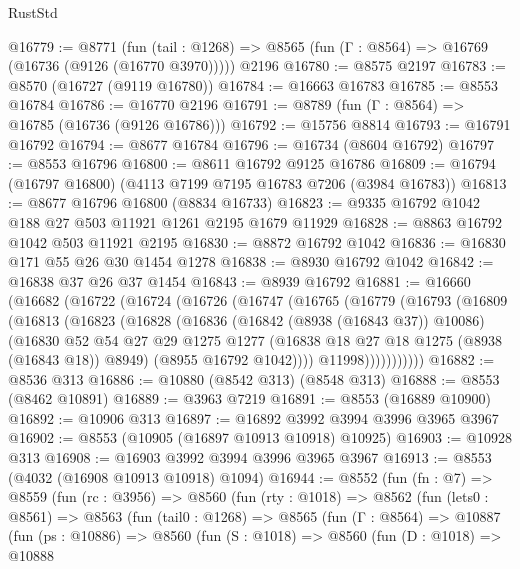 \begin{lexlean}{RustStd}
\begin{coremodule}
@16779 := @8771
    (fun (tail : @1268) => @8565 (fun (Γ : @8564) => @16769 (@16736 (@9126 (@16770 @3970)))))
    @2196
@16780 := @8575 @2197
@16783 := @8570 (@16727 (@9119 @16780))
@16784 := @16663 @16783
@16785 := @8553 @16784
@16786 := @16770 @2196
@16791 := @8789 (fun (Γ : @8564) => @16785 (@16736 (@9126 @16786)))
@16792 := @15756 @8814
@16793 := @16791 @16792
@16794 := @8677 @16784
@16796 := @16734 (@8604 @16792)
@16797 := @8553 @16796
@16800 := @8611 @16792 @9125 @16786
@16809 := @16794 (@16797 @16800) (@4113 @7199 @7195 @16783 @7206 (@3984 @16783))
@16813 := @8677 @16796 @16800 (@8834 @16733)
@16823 := @9335 @16792 @1042 @188 @27 @503 @11921 @1261 @2195 @1679 @11929
@16828 := @8863 @16792 @1042 @503 @11921 @2195
@16830 := @8872 @16792 @1042
@16836 := @16830 @171 @55 @26 @30 @1454 @1278
@16838 := @8930 @16792 @1042
@16842 := @16838 @37 @26 @37 @1454
@16843 := @8939 @16792
@16881 := @16660
    (@16682
      (@16722
        (@16724
          (@16726
            (@16747
              (@16765
                (@16779
                  (@16793
                    (@16809
                      (@16813
                        (@16823
                          (@16828
                            (@16836
                              (@16842 (@8938 (@16843 @37)) @10086)
                              (@16830
                                @52
                                @54
                                @27
                                @29
                                @1275
                                @1277
                                (@16838 @18 @27 @18 @1275 (@8938 (@16843 @18)) @8949)
                                (@8955 @16792 @1042))))
                          @11998)))))))))))
@16882 := @8536 @313
@16886 := @10880 (@8542 @313) (@8548 @313)
@16888 := @8553 (@8462 @10891)
@16889 := @3963 @7219
@16891 := @8553 (@16889 @10900)
@16892 := @10906 @313
@16897 := @16892 @3992 @3994 @3996 @3965 @3967
@16902 := @8553 (@10905 (@16897 @10913 @10918) @10925)
@16903 := @10928 @313
@16908 := @16903 @3992 @3994 @3996 @3965 @3967
@16913 := @8553 (@4032 (@16908 @10913 @10918) @1094)
@16944 := @8552
    (fun (fn : @7) =>
    @8559
      (fun (rc : @3956) =>
      @8560
        (fun (rty : @1018) =>
        @8562
          (fun (lets0 : @8561) =>
          @8563
            (fun (tail0 : @1268) =>
            @8565
              (fun (Γ : @8564) =>
              @10887
                (fun (ps : @10886) =>
                @8560
                  (fun (S : @1018) =>
                  @8560
                    (fun (D : @1018) =>
                    @10888

\end{coremodule}
\end{lexlean}

